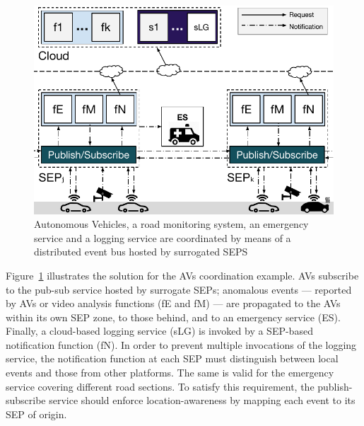 \documentclass[letterpaper, 10 pt, conference]{ieeeconf}  %
\begin{document}
\begin{figure}[tbp]
	\centering
	\includegraphics[width=1\linewidth]{Figs/Edge_Coordination_AVs_wide.pdf}
	\caption{Autonomous Vehicles, a road monitoring system, an emergency service and a logging service are coordinated by means of a distributed event bus hosted by surrogated SEPS}
	\label{fig:Edge_Coordination_AVs}
\end{figure}


Figure~\ref{fig:Edge_Coordination_AVs} illustrates the solution for the AVs coordination example. AVs subscribe to the pub-sub service hosted by surrogate SEPs; anomalous events --- reported by AVs or video analysis functions (fE and fM) --- are propagated to the AVs within its own SEP zone, to those behind, and to an emergency service (ES). Finally, a cloud-based logging service (sLG) is invoked by a SEP-based notification function (fN). In order to prevent multiple invocations of the logging service, the notification function at each SEP must distinguish between local events and those from other platforms. The same is valid for the emergency service covering different road sections. To satisfy this requirement, the publish-subscribe service should enforce location-awareness by mapping each event to its SEP of origin. 


\end{document}
